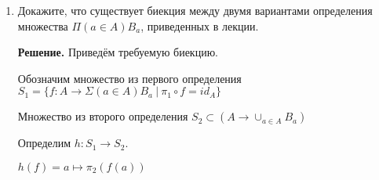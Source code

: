 \begin{enumerate}
\begin{enumerate}
\item Функция $plus : \mathbb{Q} \times \mathbb{Q} \to \mathbb{Q}$, возвращающая сумму двух чисел.
\begin{equation*}
	plus = ((p1, q1),  (p2, q2)) \mapsto (p1 * q2 + p2 * q1, q1 * q2)
\end{equation*}

Корректность: Функция сохраняет эквивалентность: если $(x_1,y_1) \sim (x_1',y_1')$ и $(x_2,y_2) \sim (x_2',y_2')$, то $plus([(x_1,y_1), (x_2, y_2)]_\sim) 
\sim plus([(x_1',y_1'), (x_2', y_2')]_\sim)$. 

Это свойство выполнено:

 $plus([(x_1,y_1), (x_2, y_2)]_\sim)     = (x_1 * y_2 + x_2 * y_1, y_1 * y_2)$,
 
 $plus([(x_1',y_1'), (x_2', y_2')]_\sim) = (x_1' * y_2' + x_2' * y_1', y_1' * y_2')$. 
 
 Заметим, что $(x_1 * y_2 + x_2 * y_1, y_1 * y_2) \sim (x_1' * y_2' + x_2' * y_1', y_1' * y_2') 
\Leftrightarrow (x_1 * y_2 + x_2 * y_1) * (y_1' * y_2') = (y_1 * y_2) * (x_1' * y_2' + x_2' * y_1') \Leftrightarrow x_1  y_2  y_1'  y_2' + x_2  y_1  y_1'  y_2' 
              = x_1'  y_2'  y_1  y_2 + x_2'  y_1'  y_1  y_2$
 
 Воспользуемся 
 $$(x_1,y_1) \sim (x_1',y_1') \Leftrightarrow x_1y_1' = x_1'y_1 = a$$
 $$(x_2,y_2) \sim (x_2',y_2') \Leftrightarrow x_2y_2' = x_2'y_2 = b$$
 
 Получим: 
 $$ y_2 y_2' \underline{y_1'x_1} +  y_1  y_1' \doubleunderline{x_2y_2'} 
 = \underline{x_1'y_1}  y_2' y_2 + \doubleunderline{x_2'y_2}  y_1'  y_1 \Leftrightarrow 
 a y_2 y_2' + b y_1  y_1' = a y_2' y_2 + b y_1'  y_1 $$
Последнее равенство очевидно, значит эквивалентность сохранена.

\end{enumerate}

\item Докажите, что существует биекция между двумя вариантами определения множества $\Pi (a \in A) B_a$, приведенных в лекции.

\textbf{Решение.} Приведём требуемую биекцию. 

Обозначим множество из первого определения $S_1 = \{f:A\rightarrow \Sigma(a\in A) B_a \ \big| 
\ \pi_1\circ f = id_A \}$

Множество из второго определения $S_2 \subset (A \rightarrow \cup_{a \in A} B_a)$

Определим $h:S_1 \rightarrow S_2$. 

$h(f) = a \mapsto \pi_2(f(a))$


\end{enumerate}

